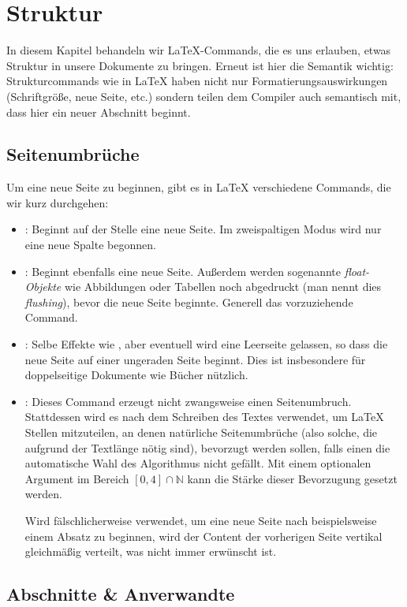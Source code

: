\chapter{Struktur}
In diesem Kapitel behandeln wir \LaTeX -Commands, die es uns erlauben, etwas Struktur in unsere Dokumente zu bringen.
Erneut ist hier die Semantik wichtig:
Strukturcommands wie  in \LaTeX{} haben nicht nur Formatierungsauswirkungen (Schriftgröße, neue Seite, etc.) sondern teilen dem Compiler auch semantisch mit, dass hier ein neuer Abschnitt beginnt.

\section{Seitenumbrüche}
Um eine neue Seite zu beginnen, gibt es in \LaTeX{} verschiedene Commands, die wir kurz durchgehen:
\begin{itemize}
	\item {}: Beginnt auf der Stelle eine neue Seite.
	Im zweispaltigen Modus wird nur eine neue Spalte begonnen.
	\item {}: Beginnt ebenfalls eine neue Seite.
	Außerdem werden sogenannte \emph{float-Objekte} wie Abbildungen oder Tabellen noch abgedruckt (man nennt dies \emph{flushing}), bevor die neue Seite beginnte.
	Generell das vorzuziehende Command.
	\item {}: Selbe Effekte wie , aber eventuell wird eine Leerseite gelassen, so dass die neue Seite auf einer ungeraden Seite beginnt.
	Dies ist insbesondere für doppelseitige Dokumente wie Bücher nützlich.
	\item {}: Dieses Command erzeugt nicht zwangsweise einen Seitenumbruch.
	Stattdessen wird es nach dem Schreiben des Textes verwendet, um \LaTeX{} Stellen mitzuteilen, an denen natürliche Seitenumbrüche (also solche, die aufgrund der Textlänge nötig sind), bevorzugt werden sollen, falls einen die automatische Wahl des Algorithmus nicht gefällt.
	Mit einem optionalen Argument im Bereich $[0,4] \cap \mathbb{N}$ kann die Stärke dieser Bevorzugung gesetzt werden.

	Wird  fälschlicherweise verwendet, um eine neue Seite nach beispielsweise einem Absatz zu beginnen, wird der Content der vorherigen Seite vertikal gleichmäßig verteilt, was nicht immer erwünscht ist.
\end{itemize}

\section{Abschnitte \& Anverwandte}

